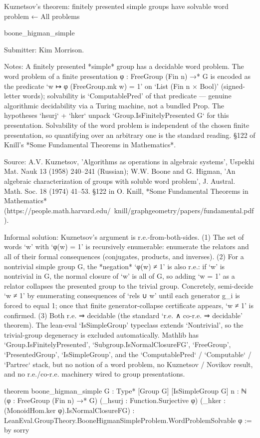 Kuznetsov's theorem: finitely presented simple groups have solvable word problem
← All problems

boone_higman_simple

Submitter: Kim Morrison.

Notes: A finitely presented *simple* group has a decidable word problem. The word problem of a finite presentation φ : FreeGroup (Fin n) →* G is encoded as the predicate `w ↦ φ (FreeGroup.mk w) = 1' on `List (Fin n × Bool)' (signed-letter words); solvability is `ComputablePred' of that predicate — genuine algorithmic decidability via a Turing machine, not a bundled Prop. The hypotheses `hsurj` + `hker` unpack `Group.IsFinitelyPresented G` for this presentation. Solvability of the word problem is independent of the chosen finite presentation, so quantifying over an arbitrary one is the standard reading. §122 of Knill's *Some Fundamental Theorems in Mathematics*.

Source: A.V. Kuznetsov, 'Algorithms as operations in algebraic systems', Uspekhi Mat. Nauk 13 (1958) 240–241 (Russian); W.W. Boone and G. Higman, 'An algebraic characterization of groups with soluble word problem', J. Austral. Math. Soc. 18 (1974) 41–53. §122 in O. Knill, *Some Fundamental Theorems in Mathematics* (https://people.math.harvard.edu/~knill/graphgeometry/papers/fundamental.pdf).

Informal solution: Kuznetsov's argument is r.e.-from-both-sides. (1) The set of words `w' with `φ(w) = 1' is recursively enumerable: enumerate the relators and all of their formal consequences (conjugates, products, and inverses). (2) For a nontrivial simple group G, the *negation* `φ(w) ≠ 1' is also r.e.: if `w' is nontrivial in G, the normal closure of `w' is all of G, so adding `w = 1' as a relator collapses the presented group to the trivial group. Concretely, semi-decide `w ≠ 1' by enumerating consequences of `rels ∪ {w}' until each generator g_i is forced to equal 1; once that finite generator-collapse certificate appears, `w ≠ 1' is confirmed. (3) Both r.e. ⇒ decidable (the standard `r.e. ∧ co-r.e. ⇒ decidable' theorem). The lean-eval `IsSimpleGroup' typeclass extends `Nontrivial', so the trivial-group degeneracy is excluded automatically. Mathlib has `Group.IsFinitelyPresented', `Subgroup.IsNormalClosureFG', `FreeGroup', `PresentedGroup', `IsSimpleGroup', and the `ComputablePred` / `Computable` / `Partrec` stack, but no notion of a word problem, no Kuznetsov / Novikov result, and no r.e./co-r.e. machinery wired to group presentations.

theorem boone_higman_simple {G : Type*} [Group G] [IsSimpleGroup G]
    {n : ℕ} (φ : FreeGroup (Fin n) →* G)
    (_hsurj : Function.Surjective φ)
    (_hker : (MonoidHom.ker φ).IsNormalClosureFG) :
    LeanEval.GroupTheory.BooneHigmanSimpleProblem.WordProblemSolvable φ := by
  sorry
